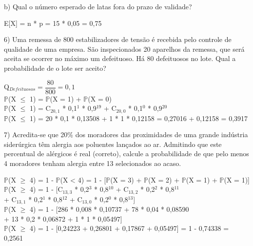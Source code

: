 \documentclass[12pt,a4paper]{article}
\begin{document}
	\vspace{1cm}
	b) Qual o número esperado de latas fora do prazo de validade?
	\begin{center}
		\vspace{0.5cm}
		E[X] = n * p = 15 * 0,05 = 0,75
	\end{center}
	\vspace{1cm}
	6) Uma remessa de 800 estabilizadores de tensão é recebida pelo controle de qualidade de uma empresa. São inspecionados 20 aparelhos da remessa, que será aceita se ocorrer no máximo um defeituoso. Há 80 defeituosos no lote. Qual a probabilidade de o lote ser	aceito?
	\begin{center}
		\vspace{0.5cm}
		Q$_{Defeituosos} = \dfrac{80}{800} = 0,1$
		\vspace{0.75cm}\\
		$\mathbb{P}$(X $\leq$ 1) = $\mathbb{P}$(X = 1) + $\mathbb{P}$(X = 0)
		\vspace{0.25cm}\\
		$\mathbb{P}$(X $\leq$ 1) = C$_{20, 1}$ * 0,1$^1$ * 0,9$^{19}$ + C$_{20, 0}$ * 0,1$^0$ * 0,9$^{20}$ 
		\vspace{0.25cm}\\
		$\mathbb{P}$(X $\leq$ 1) = 20 * 0,1 * 0,13508 + 1 * 1 * 0,12158 = 0,27016 + 0,12158 = 0,3917
	\end{center}
	\vspace{1cm}
	7) Acredita-se que 20\% dos moradores das proximidades de uma grande indústria siderúrgica têm alergia aos poluentes lançados ao ar. Admitindo que este percentual de alérgicos é real (correto), calcule a probabilidade de que pelo menos 4 moradores tenham alergia entre 13 selecionados ao acaso.
	\begin{center}
		\vspace{0.5cm}
		$\mathbb{P}$(X $\geq$ 4) = 1 - $\mathbb{P}$(X < 4) = 1 - [$\mathbb{P}$(X = 3) + $\mathbb{P}$(X = 2) + $\mathbb{P}$(X = 1) + $\mathbb{P}$(X = 1)]
		\vspace{0.25cm}\\
		$\mathbb{P}$(X $\geq$ 4) = 1 - [C$_{13, 3}$ * 0,2$^3$ * 0,8$^{10}$ + C$_{13, 2}$ * 0,2$^2$ * 0,8$^{11}$\\ + C$_{13, 1}$ * 0,2$^1$ * 0,8$^{12}$ + C$_{13, 0}$ * 0,2$^0$ * 0,8$^{13}$]
		\vspace{0.25cm}\\
		$\mathbb{P}$(X $\geq$ 4) = 1 - [286 * 0,008 * 0,10737 + 78 * 0,04 * 0,08590\\
		+ 13 * 0,2 * 0,06872 + 1 * 1 * 0,05497]
		\vspace{0.25cm}\\
		$\mathbb{P}$(X $\geq$ 4) = 1 - [0,24223 + 0,26801 + 0,17867 + 0,05497] = 1 - 0,74338 = 0,2561
	\end{center}
\end{document}

